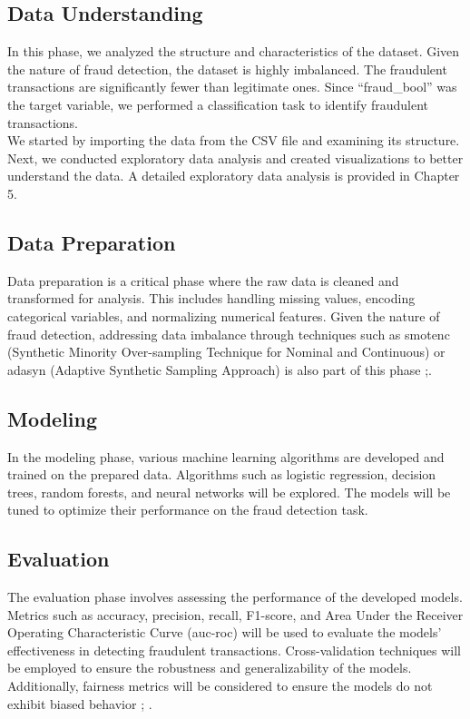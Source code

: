 \documentclass[12pt,a4paper]{report}
\begin{document}
\subsection{Data Understanding}
In this phase, we analyzed the structure and characteristics of the dataset. Given the nature of fraud detection, the dataset is highly imbalanced. The fraudulent transactions are significantly fewer than legitimate ones.  Since ``fraud\_bool'' was the target variable, we performed a classification task to identify fraudulent transactions.\\

We started by importing the data from the CSV file and examining its structure. Next, we conducted exploratory data analysis and created visualizations to better understand the data. A detailed exploratory data analysis is provided in Chapter 5.\\

\subsection{Data Preparation}
Data preparation is a critical phase where the raw data is cleaned and transformed for analysis. This includes handling missing values, encoding categorical variables, and normalizing numerical features. Given the nature of fraud detection, addressing data imbalance through techniques such as \acrshort{smotenc} (Synthetic Minority Over-sampling Technique for Nominal and Continuous) or \acrshort{adasyn} (Adaptive Synthetic Sampling Approach) is also part of this phase \citep{chawla2002smote};\citep{he2008adasyn}.\\


\subsection{Modeling}
In the modeling phase, various machine learning algorithms are developed and trained on the prepared data. Algorithms such as logistic regression, decision trees, random forests, and neural networks will be explored. The models will be tuned to optimize their performance on the fraud detection task.

\subsection{Evaluation}
The evaluation phase involves assessing the performance of the developed models. Metrics such as accuracy, precision, recall, F1-score, and Area Under the Receiver Operating Characteristic Curve (\acrshort{auc}-\acrshort{roc}) will be used to evaluate the models' effectiveness in detecting fraudulent transactions. Cross-validation techniques will be employed to ensure the robustness and generalizability of the models. Additionally, fairness metrics will be considered to ensure the models do not exhibit biased behavior \citep{barocas2023fairness}; \citep{mehrabi2021survey}.
\end{document}
